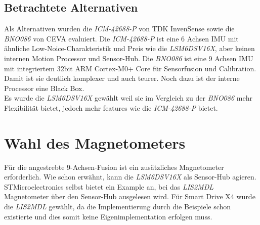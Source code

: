 \subsection{Betrachtete Alternativen}
Als Alternativen wurden die \textit{ICM-42688-P} von TDK InvenSense \cite{tdk_icm42688p}
sowie die \textit{BNO086} von CEVA \cite{ceva_bno08x} evaluiert.
Die \textit{ICM-42688-P} ist eine 6 Achsen IMU mit ähnliche Low-Noice-Charakteristik
und Preis wie die \textit{LSM6DSV16X}, aber keinen internen Motion Processor und
Sensor-Hub. Die \textit{BNO086} ist eine 9 Achsen IMU mit integriertem 
32bit ARM Cortex-M0+ Core für Sensorfusion und Calibration.
Damit ist sie deutlich komplexer und auch
teurer. Noch dazu ist der interne Processor eine Black Box. \\
Es wurde die \textit{LSM6DSV16X} gewählt weil sie im Vergleich zu der
\textit{BNO086} mehr Flexibilität bietet, jedoch mehr features wie die
\textit{ICM-42688-P} bietet.

\section{Wahl des Magnetometers}
Für die angestrebte 9-Achsen-Fusion ist ein zusätzliches Magnetometer
erforderlich. Wie schon erwähnt, kann die \textit{LSM6DSV16X} als Sensor-Hub
agieren. STMicroelectronics selbst bietet ein Example an, bei das
\textit{LIS2MDL} Magnetometer über den Sensor-Hub ausgelesen wird. Für Smart
Drive X4 wurde die \textit{LIS2MDL} gewählt, da die Implementierung durch die
Beispiele schon existierte und dies somit keine Eigenimplementation erfolgen
muss. 
